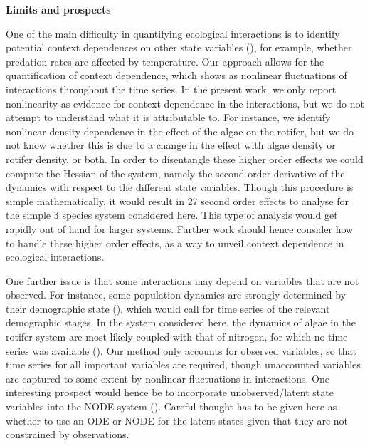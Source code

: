 \documentclass[11pt, oneside]{article}
\begin{document}

\textbf{Limits and prospects}

One of the main difficulty in quantifying ecological interactions is to identify potential context dependences on other state variables (\cite{Song2021}), for example, whether predation rates are affected by temperature.
Our approach allows for the quantification of context dependence, which shows as nonlinear fluctuations of interactions throughout the time series.
In the present work, we only report nonlinearity as evidence for context dependence in the interactions, but we do not attempt to understand what it is attributable to.
For instance, we identify nonlinear density dependence in the effect of the algae on the rotifer, but we do not know whether this is due to a change in the effect with algae density or rotifer density, or both. 
In order to disentangle these higher order effects we could compute the Hessian of the system, namely the second order derivative of the dynamics with respect to the different state variables. 
Though this procedure is simple mathematically, it would result in 27 second order effects to analyse for the simple 3 species system considered here.
This type of analysis would get rapidly out of hand for larger systems.
Further work should hence consider how to handle these higher order effects, as a way to unveil context dependence in ecological interactions. 

One further issue is that some interactions may depend on variables that are not observed.
For instance, some population dynamics are strongly determined by their demographic state (\cite{Lande2002,Coulson2004}), which would call for time series of the relevant demographic stages.
In the system considered here, the dynamics of algae in the rotifer system are most likely coupled with that of nitrogen, for which no time series was available (\cite{Hiltunen2013}).
Our method only accounts for observed variables, so that time series for all important variables are required, though unaccounted variables are captured to some extent by nonlinear fluctuations in interactions.
One interesting prospect would hence be to incorporate unobserved/latent state variables into the NODE system (\cite{Dupont2019,Zhang2019,Frank2022}).
Careful thought has to be given here as whether to use an ODE or NODE for the latent states given that they are not constrained by observations. 
\end{document}
